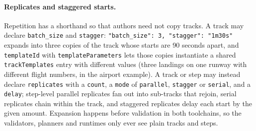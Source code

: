 \documentclass[10pt]{article}
\newcommand{\code}[1]{\texttt{#1}}
\begin{document}
\paragraph{Replicates and staggered starts.}
Repetition has a shorthand so that authors need not copy tracks. A track may declare \code{batch\_size} and \code{stagger}: \code{"batch\_size": 3, "stagger": "1m30s"} expands into three copies of the track whose starts are 90 seconds apart, and \code{templateId} with \code{templateParameters} lets those copies instantiate a shared \code{trackTemplates} entry with different values (three landings on one runway with different flight numbers, in the airport example). A track or step may instead declare \code{replicates} with a \code{count}, a \code{mode} of \code{parallel}, \code{stagger} or \code{serial}, and a \code{delay}; step-level parallel replicates fan out into sub-tracks that rejoin, serial replicates chain within the track, and staggered replicates delay each start by the given amount. Expansion happens before validation in both toolchains, so the validators, planners and runtimes only ever see plain tracks and steps.
\end{document}
